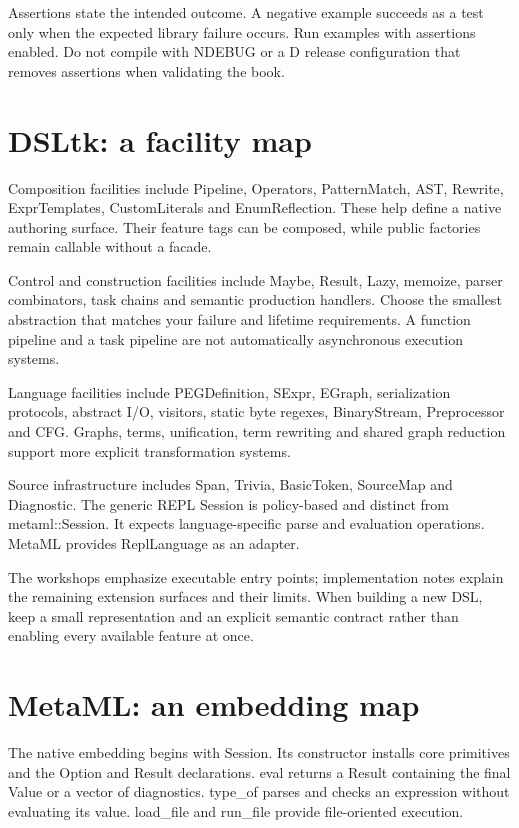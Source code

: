 Assertions state the intended outcome. A negative example succeeds as a test only when the expected library failure occurs. Run examples with assertions enabled. Do not compile with NDEBUG or a D release configuration that removes assertions when validating the book.

\clearpage
\section*{DSLtk: a facility map}
Composition facilities include Pipeline, Operators, PatternMatch, AST, Rewrite, ExprTemplates, CustomLiterals and EnumReflection. These help define a native authoring surface. Their feature tags can be composed, while public factories remain callable without a facade.

Control and construction facilities include Maybe, Result, Lazy, memoize, parser combinators, task chains and semantic production handlers. Choose the smallest abstraction that matches your failure and lifetime requirements. A function pipeline and a task pipeline are not automatically asynchronous execution systems.

Language facilities include PEGDefinition, SExpr, EGraph, serialization protocols, abstract I/O, visitors, static byte regexes, BinaryStream, Preprocessor and CFG. Graphs, terms, unification, term rewriting and shared graph reduction support more explicit transformation systems.

Source infrastructure includes Span, Trivia, BasicToken, SourceMap and Diagnostic. The generic REPL Session is policy-based and distinct from metaml::Session. It expects language-specific parse and evaluation operations. MetaML provides ReplLanguage as an adapter.

The workshops emphasize executable entry points; implementation notes explain the remaining extension surfaces and their limits. When building a new DSL, keep a small representation and an explicit semantic contract rather than enabling every available feature at once.

\clearpage
\section*{MetaML: an embedding map}
The native embedding begins with Session. Its constructor installs core primitives and the Option and Result declarations. eval returns a Result containing the final Value or a vector of diagnostics. type\_of parses and checks an expression without evaluating its value. load\_file and run\_file provide file-oriented execution.

